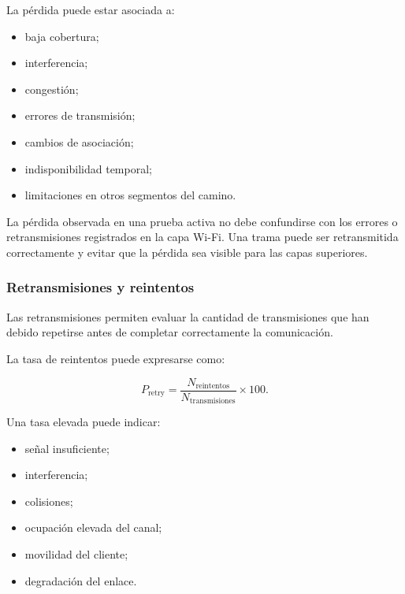 La pérdida puede estar asociada a:

\begin{itemize}
    \item baja cobertura;

    \item interferencia;

    \item congestión;

    \item errores de transmisión;

    \item cambios de asociación;

    \item indisponibilidad temporal;

    \item limitaciones en otros segmentos del camino.
\end{itemize}

La pérdida observada en una prueba activa no debe confundirse con los
errores o retransmisiones registrados en la capa Wi-Fi. Una trama puede
ser retransmitida correctamente y evitar que la pérdida sea visible para
las capas superiores.


\subsubsection*{Retransmisiones y reintentos}

Las retransmisiones permiten evaluar la cantidad de transmisiones que han
debido repetirse antes de completar correctamente la comunicación.

La tasa de reintentos puede expresarse como:

\[
    P_{\mathrm{retry}}
    =
    \frac{
        N_{\mathrm{reintentos}}
    }{
        N_{\mathrm{transmisiones}}
    }
    \times
    100.
\]

Una tasa elevada puede indicar:

\begin{itemize}
    \item señal insuficiente;

    \item interferencia;

    \item colisiones;

    \item ocupación elevada del canal;

    \item movilidad del cliente;

    \item degradación del enlace.
\end{itemize}

